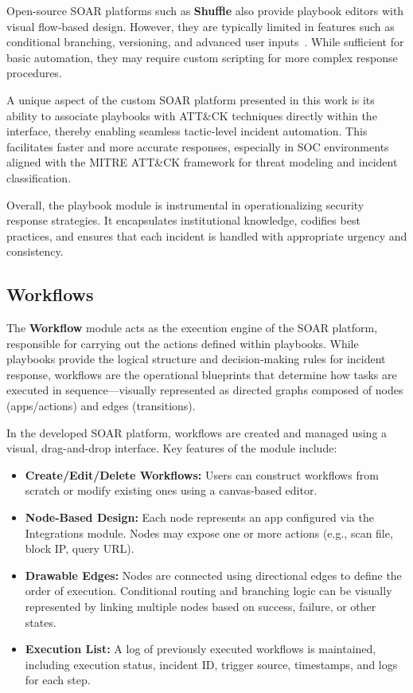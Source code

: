 Open-source SOAR platforms such as \textbf{Shuffle} also provide playbook editors with visual flow-based design. However, they are typically limited in features such as conditional branching, versioning, and advanced user inputs~\cite{techtarget}. While sufficient for basic automation, they may require custom scripting for more complex response procedures.

A unique aspect of the custom SOAR platform presented in this work is its ability to associate playbooks with ATT\&CK techniques directly within the interface, thereby enabling seamless tactic-level incident automation. This facilitates faster and more accurate responses, especially in SOC environments aligned with the MITRE ATT\&CK framework for threat modeling and incident classification.

Overall, the playbook module is instrumental in operationalizing security response strategies. It encapsulates institutional knowledge, codifies best practices, and ensures that each incident is handled with appropriate urgency and consistency.

\subsection{Workflows}

The \textbf{Workflow} module acts as the execution engine of the SOAR platform, responsible for carrying out the actions defined within playbooks. While playbooks provide the logical structure and decision-making rules for incident response, workflows are the operational blueprints that determine how tasks are executed in sequence—visually represented as directed graphs composed of nodes (apps/actions) and edges (transitions).

In the developed SOAR platform, workflows are created and managed using a visual, drag-and-drop interface. Key features of the module include:

\begin{itemize}
    \item \textbf{Create/Edit/Delete Workflows:} Users can construct workflows from scratch or modify existing ones using a canvas-based editor.
    
    \item \textbf{Node-Based Design:} Each node represents an app configured via the Integrations module. Nodes may expose one or more actions (e.g., scan file, block IP, query URL).
    
    \item \textbf{Drawable Edges:} Nodes are connected using directional edges to define the order of execution. Conditional routing and branching logic can be visually represented by linking multiple nodes based on success, failure, or other states.
    
    \item \textbf{Execution List:} A log of previously executed workflows is maintained, including execution status, incident ID, trigger source, timestamps, and logs for each step.
\end{itemize}

